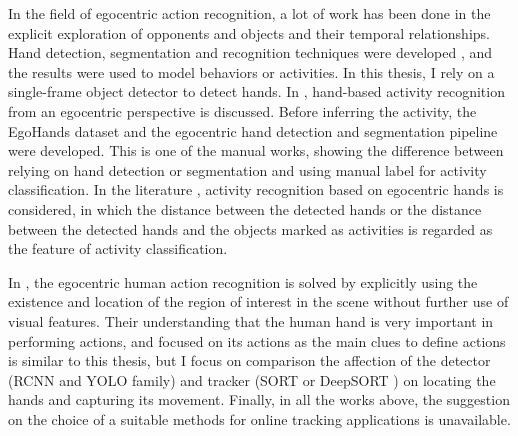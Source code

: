In the field of egocentric action recognition, a lot of work has been done in the explicit exploration of opponents and objects and their temporal relationships. Hand detection, segmentation and recognition techniques were developed \cite{6619302} \cite{6910041} \cite{10.1016/j.cviu.2016.09.005}, and the results were used to model behaviors or activities. In this thesis, I rely on a single-frame object detector to detect hands. In \cite{7410583}, hand-based activity recognition from an egocentric perspective is discussed. Before inferring the activity, the EgoHands dataset and the egocentric hand detection and segmentation pipeline were developed. This is one of the manual works, showing the difference between relying on hand detection or segmentation and using manual label for activity classification. In the literature \cite{Recognition}, activity recognition based on egocentric hands is considered, in which the distance between the detected hands or the distance between the detected hands and the objects marked as activities is regarded as the feature of activity classification.

In \cite{9060114}, the egocentric human action recognition is solved by explicitly using the existence and location of the region of interest in the scene without further use of visual features. Their understanding that the human hand is very important in performing actions, and focused on its actions as the main clues to define actions is similar to this thesis, but I focus on comparison the affection of the detector (RCNN and YOLO family) and tracker (SORT \cite{DBLP:journals/corr/BewleyGORU16} or DeepSORT \cite{DBLP:journals/corr/WojkeBP17} ) on locating the hands and capturing its movement. Finally, in all the works above, the suggestion on the choice of a suitable methods for online tracking applications is unavailable.
